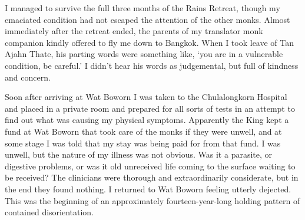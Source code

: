 I managed to survive the full three months of the Rains Retreat, though
my emaciated condition had not escaped the attention of the other monks.
Almost immediately after the retreat ended, the parents of my translator
monk companion kindly offered to fly me down to Bangkok. When I took
leave of Tan Ajahn Thate, his parting words were something like, `you
are in a vulnerable condition, be careful.' I didn't hear his words as
judgemental, but full of kindness and concern.

Soon after arriving at Wat Boworn I was taken to the \mbox{Chulalongkorn} Hospital
and placed in a private room and prepared for all sorts of tests in an
attempt to find out what was causing my physical symptoms. Apparently
the King kept a fund at Wat Boworn that took care of the monks if they
were unwell, and at some stage I was told that my stay was being paid
for from that fund. I was unwell, but the nature of my illness was not
obvious. Was it a parasite, or digestive problems, or was it old
unreceived life coming to the surface waiting to be received? The
clinicians were thorough and extraordinarily considerate, but in the end
they found nothing. I returned to Wat Boworn feeling utterly dejected.
This was the beginning of an approximately fourteen-year-long holding
pattern of contained disorientation.

